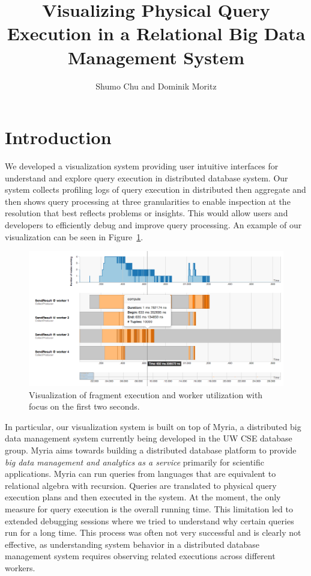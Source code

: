 \documentclass[11pt]{scrartcl}
\begin{document}
\title{Visualizing Physical Query Execution in a Relational Big Data Management System}
\author{Shumo Chu and Dominik Moritz}
\date{}

\maketitle

\section{Introduction}
We developed a visualization system providing user intuitive interfaces for understand and explore query execution in distributed database system. Our system collects profiling logs of query execution in distributed then aggregate and then shows query processing at three granularities to enable inspection at the resolution that best reflects problems or insights. This would allow users and developers to efficiently debug and improve query processing. An example of our visualization can be seen in Figure~\ref{fig:fig1}.

\begin{figure}[H]
  \begin{center}
    \includegraphics[width=.95\textwidth]{figure1}
  \end{center}
  \caption{Visualization of fragment execution and worker utilization with focus on the first two seconds.}
  \label{fig:fig1}
\end{figure}

In particular, our visualization system is built on top of Myria, a distributed big data management system currently being developed in the UW CSE database group. Myria aims towards building a distributed database platform to provide \emph{big data management and analytics as a service} primarily for scientific applications. Myria can run queries from languages that are equivalent to relational algebra with recursion. Queries are translated to physical query execution plans and then executed in the system. At the moment, the only measure for query execution is the overall running time. This limitation led to extended debugging sessions where we tried to understand why certain queries run for a long time. This process was often not very successful and is clearly not effective, as understanding system behavior in a distributed database management system requires observing related executions across different workers.
\end{document}
